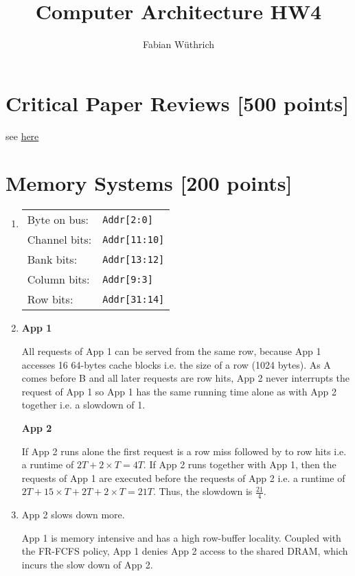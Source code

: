 \documentclass[a4paper]{article}
\title{Computer Architecture HW4}
\author{Fabian Wüthrich}
\begin{document}
\maketitle

\section{Critical Paper Reviews [500 points]}

see \href{https://safari.ethz.ch/review/architecture20/}{here}

\section{Memory Systems [200 points]}

\begin{enumerate}[label=\alph*)]
    \item
        \begin{tabular}{l l}
            Byte on bus: & \verb|Addr[2:0]| \\
            Channel bits:  & \verb|Addr[11:10]| \\
            Bank bits: & \verb|Addr[13:12]| \\
            Column bits: & \verb|Addr[9:3]| \\
            Row bits: & \verb|Addr[31:14]| \\
        \end{tabular}
    \item
        \textbf{App 1}

        All requests of App 1 can be served from the same row, because App
        1 accesses 16 64-bytes cache blocks i.e. the size of a row (1024 bytes).
        As A comes before B and all later requests are row hits, App 2 never
        interrupts the request of App 1 so App 1 has the same running time
        alone as with App 2 together i.e. a slowdown of 1.

        \textbf{App 2}

        If App 2 runs alone the first request is a row miss followed by to row
        hits i.e. a runtime of $2T + 2 \times T = 4T$. If App 2 runs together
        with App 1, then the requests of App 1 are executed before the requests
        of App 2 i.e. a runtime of $2T + 15 \times T + 2T + 2 \times T = 21T$.
        Thus, the slowdown is $\frac{21}{4}$.

    \item App 2 slows down more.

        App 1 is memory intensive and has a high row-buffer locality. Coupled
        with the FR-FCFS policy, App 1 denies App 2 access to the shared DRAM,
        which incurs the slow down of App 2.


\end{enumerate}
\end{document}
